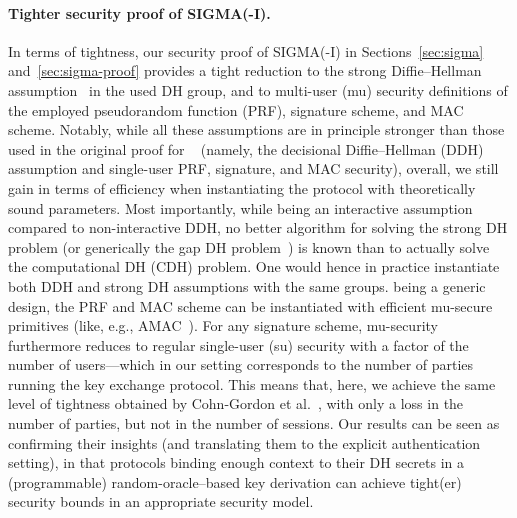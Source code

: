 \paragraph{Tighter security proof of SIGMA(-I).}
In terms of tightness, our security proof of SIGMA(-I) in Sections~\ref{sec:sigma} and~\ref{sec:sigma-proof} provides a tight reduction to the strong Diffie--Hellman assumption~\cite{RSA:AbdBelRog01} in the used DH group, and to multi-user (mu) security definitions of the employed pseudorandom function (PRF), signature scheme, and MAC scheme.
Notably, while all these assumptions are in principle stronger than those used in the original proof for \SIGMA~\cite{C:CanKra02} (namely, the decisional Diffie--Hellman (DDH) assumption and single-user PRF, signature, and MAC security),
overall, we still gain in terms of efficiency when instantiating the protocol with theoretically sound parameters.
Most importantly, while being an interactive assumption compared to non-interactive DDH, no better algorithm for solving the strong DH problem (or generically the gap DH problem~\cite{PKC:OkaPoi01}) is known than to actually solve the computational DH (CDH) problem.
One would hence in practice instantiate both DDH and strong DH assumptions with the same groups.
\SIGMA being a generic design, the PRF and MAC scheme can be instantiated with efficient mu-secure primitives (like, e.g., AMAC~\cite{EC:BelBerTes16}).
For any signature scheme, mu-security furthermore reduces to regular single-user (su) security with a factor of the number of users---which in our setting corresponds to the number of parties running the key exchange protocol.
This means that, here, we achieve the same level of tightness obtained by Cohn-Gordon et al.~\cite{C:CCGJJ19},
with only a loss in the number of parties, but not in the number of sessions.
Our results can be seen as confirming their insights (and translating them to the explicit authentication setting),
in that protocols binding enough context to their DH secrets in a (programmable) random-oracle--based key derivation
can achieve tight(er) security bounds in an appropriate security model.

